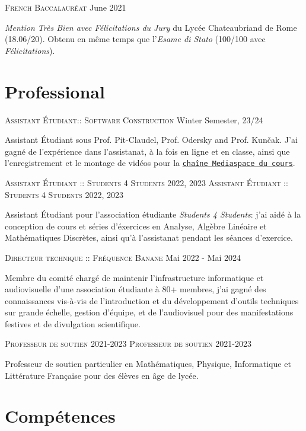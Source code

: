 \documentclass[11pt]{article}
\renewcommand{\url}[1]{{\texttt{#1}}}
\renewcommand{\line}[2]{{\vspace{4pt} \large \noindent\textsc{#1} \hfill #2}\vspace{4pt}}
\begin{document}
  \line{French Baccalauréat}{June 2021}

  \textit{Mention Très Bien avec Félicitations du Jury} du Lycée Chateaubriand de Rome (18.06/20). Obtenu en même temps que l'\textit{Esame di Stato} (100/100 avec \textit{Félicitations}).

  \section*{Professional}

  \line{Assistant Étudiant:: Software Construction}{Winter Semester, 23/24}

    Assistant Étudiant sous Prof. Pit-Claudel, Prof. Odersky and Prof. Kunčak. J'ai gagné de l'expérience dans l'assistanat, à la fois en ligne et en classe, ainsi que l'enregistrement et le montage de vidéos pour la \href{https://mediaspace.epfl.ch/channel/CS-214+Software+construction/56193}{\url{chaîne Mediaspace du cours}}.

  \line{Assistant Étudiant :: Students 4 Students}{2022, 2023}
  \line{Assistant Étudiant :: Students 4 Students}{2022, 2023}

  Assistant Étudiant pour l'association étudiante \textit{Students 4 Students}: j'ai aidé à la conception de cours et séries d'éxercices en Analyse, Algèbre Linéaire et Mathématiques Discrètes, ainsi qu'à l'assistanat pendant les séances d'exercice.

  \line{Directeur technique :: Fréquence Banane}{Mai 2022 - Mai 2024}

  Membre du comité chargé de maintenir l'infrastructure informatique et audiovisuelle d'une association étudiante à 80+ membres, j'ai gagné des connaissances vis-à-vis de l'introduction et du développement d'outils techniques sur grande échelle, gestion d'équipe, et de l'audiovisuel pour des manifestations festives et de divulgation scientifique.

  \line{Professeur de soutien}{2021-2023}
  \line{Professeur de soutien}{2021-2023}

  Professeur de soutien particulier en Mathématiques, Physique, Informatique et Littérature Française pour des élèves en âge de lycée.

  \section*{Compétences}
  
\end{document}
